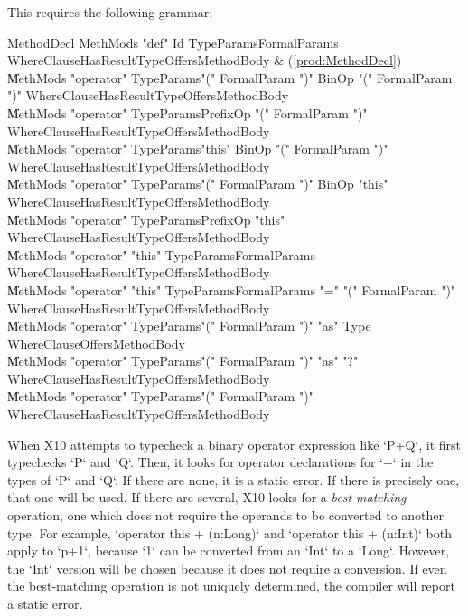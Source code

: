 This requires the following grammar: \\
\begin{bbgrammar}
          MethodDecl \: MethMods \xcd"def" Id TypeParams\opt FormalParams WhereClause\opt HasResultType\opt Offers\opt MethodBody & (\ref{prod:MethodDecl}) \\
                    \| MethMods \xcd"operator" TypeParams\opt \xcd"(" FormalParam  \xcd")" BinOp \xcd"(" FormalParam  \xcd")" WhereClause\opt HasResultType\opt Offers\opt MethodBody \\
                    \| MethMods \xcd"operator" TypeParams\opt PrefixOp \xcd"(" FormalParam  \xcd")" WhereClause\opt HasResultType\opt Offers\opt MethodBody \\
                    \| MethMods \xcd"operator" TypeParams\opt \xcd"this" BinOp \xcd"(" FormalParam  \xcd")" WhereClause\opt HasResultType\opt Offers\opt MethodBody \\
                    \| MethMods \xcd"operator" TypeParams\opt \xcd"(" FormalParam  \xcd")" BinOp \xcd"this" WhereClause\opt HasResultType\opt Offers\opt MethodBody \\
                    \| MethMods \xcd"operator" TypeParams\opt PrefixOp \xcd"this" WhereClause\opt HasResultType\opt Offers\opt MethodBody \\
                    \| MethMods \xcd"operator" \xcd"this" TypeParams\opt FormalParams WhereClause\opt HasResultType\opt Offers\opt MethodBody \\
                    \| MethMods \xcd"operator" \xcd"this" TypeParams\opt FormalParams \xcd"=" \xcd"(" FormalParam  \xcd")" WhereClause\opt HasResultType\opt Offers\opt MethodBody \\
                    \| MethMods \xcd"operator" TypeParams\opt \xcd"(" FormalParam  \xcd")" \xcd"as" Type WhereClause\opt Offers\opt MethodBody \\
                    \| MethMods \xcd"operator" TypeParams\opt \xcd"(" FormalParam  \xcd")" \xcd"as" \xcd"?" WhereClause\opt HasResultType\opt Offers\opt MethodBody \\
                    \| MethMods \xcd"operator" TypeParams\opt \xcd"(" FormalParam  \xcd")" WhereClause\opt HasResultType\opt Offers\opt MethodBody \\
\end{bbgrammar}
When X10 attempts to typecheck a binary operator expression like \xcd`P+Q`, it
first typechecks \xcd`P` and \xcd`Q`. Then, it looks for operator declarations
for \xcd`+` in the types of \xcd`P` and \xcd`Q`. If there are none, it is a
static error. If there is precisely one, that one will be used. If there are
several, X10 looks for a {\em best-matching} operation, \viz{} one which does
not require the operands to be converted to another type. For example,
\xcd`operator this + (n:Long)` and \xcd`operator this + (n:Int)` both apply to
\xcd`p+1`, because \xcd`1` can be converted from an \xcd`Int` to a \xcd`Long`.
However, the \xcd`Int` version will be chosen because it does not require a
conversion. If even the best-matching operation is not uniquely determined,
the compiler will report a static error.

